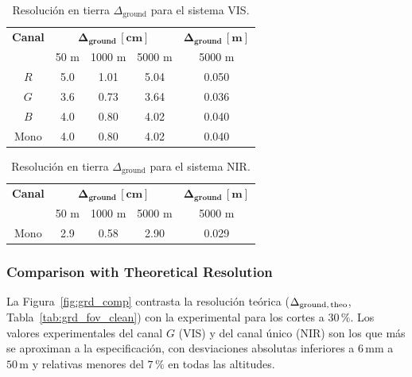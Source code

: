     \begin{table}[H]
        \centering
        \caption{Resolución en tierra \(\Delta_{\text{ground}}\) para el sistema VIS.}
        \label{tab:grd_vis}
        \begin{tabular}{|c|c|c|c|c|}
            \hline
            \rowcolor[HTML]{EFEFEF}
            \textbf{Canal} & \multicolumn{3}{c|}{\(\mathbf{\Delta_{\text{ground}}\,[\text{cm}]}\)} & 
            \(\mathbf{\Delta_{\text{ground}}\,[\text{m}]}\) \\ \cline{2-4}
            \rowcolor[HTML]{EFEFEF}
            & 50 m & 1000 m & 5000 m & 5000 m \\ \hline
            \(R\)     & 5.0  & 1.01  & 5.04 & 0.050 \\ \hline
            \(G\)     & 3.6  & 0.73  & 3.64 & 0.036 \\ \hline
            \(B\)     & 4.0  & 0.80  & 4.02 & 0.040 \\ \hline
            Mono      & 4.0  & 0.80  & 4.02 & 0.040 \\ \hline
        \end{tabular}
    \end{table}

    \begin{table}[H]
        \centering
        \caption{Resolución en tierra \(\Delta_{\text{ground}}\) para el sistema NIR.}
        \label{tab:grd_nir}
        \begin{tabular}{|c|c|c|c|c|}
            \hline
            \rowcolor[HTML]{EFEFEF}
            \textbf{Canal} & \multicolumn{3}{c|}{\(\mathbf{\Delta_{\text{ground}}\,[\text{cm}]}\)} & 
            \(\mathbf{\Delta_{\text{ground}}\,[\text{m}]}\) \\ \cline{2-4}
            \rowcolor[HTML]{EFEFEF}
            & 50 m & 1000 m & 5000 m & 5000 m \\ \hline
            Mono & 2.9 & 0.58 & 2.90 & 0.029 \\ \hline
        \end{tabular}
    \end{table}

    \subsubsection{Comparison with Theoretical Resolution}
    \label{subsub:grd_comp}
    La Figura~\ref{fig:grd_comp} contrasta la resolución teórica
    (\(\Delta_{\text{ground,\,theo}}\), Tabla~\ref{tab:grd_fov_clean})
    con la experimental para los cortes a \(30\,\%\).
    Los valores experimentales del canal \(G\) (VIS) y del canal único (NIR) son los
    que más se aproximan a la especificación, con desviaciones absolutas
    inferiores a \(6\,\mathrm{mm}\) a \(50\,\mathrm{m}\)
    y relativas menores del \(7\,\%\) en todas las altitudes.

